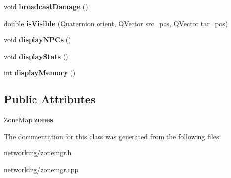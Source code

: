 \begin{DoxyCompactItemize}
\item 
void {\bfseries broadcast\+Damage} ()\hypertarget{classZoneMgr_a64ee760dcee06363efee4db7d6d803fe}{}\label{classZoneMgr_a64ee760dcee06363efee4db7d6d803fe}

\item 
double {\bfseries is\+Visible} (\hyperlink{structQuaternion}{Quaternion} orient, Q\+Vector src\+\_\+pos, Q\+Vector tar\+\_\+pos)\hypertarget{classZoneMgr_ac5433d191751f71c3c80fe45aaed5ad8}{}\label{classZoneMgr_ac5433d191751f71c3c80fe45aaed5ad8}

\item 
void {\bfseries display\+N\+P\+Cs} ()\hypertarget{classZoneMgr_a3f4b83cffa09daaa5221ff78fef9437a}{}\label{classZoneMgr_a3f4b83cffa09daaa5221ff78fef9437a}

\item 
void {\bfseries display\+Stats} ()\hypertarget{classZoneMgr_ac70dfa549ef8dd36a56c4ecaafba8fa8}{}\label{classZoneMgr_ac70dfa549ef8dd36a56c4ecaafba8fa8}

\item 
int {\bfseries display\+Memory} ()\hypertarget{classZoneMgr_af095b2732134d67b585e50672e34a0e0}{}\label{classZoneMgr_af095b2732134d67b585e50672e34a0e0}

\end{DoxyCompactItemize}
\subsection*{Public Attributes}
\begin{DoxyCompactItemize}
\item 
Zone\+Map {\bfseries zones}\hypertarget{classZoneMgr_a80e3e6023998cb903d855fa6e19f44ce}{}\label{classZoneMgr_a80e3e6023998cb903d855fa6e19f44ce}

\end{DoxyCompactItemize}


The documentation for this class was generated from the following files\+:\begin{DoxyCompactItemize}
\item 
networking/zonemgr.\+h\item 
networking/zonemgr.\+cpp\end{DoxyCompactItemize}
